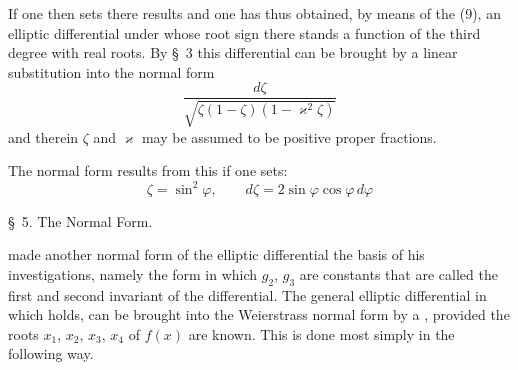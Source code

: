 
If one then sets
there results
and one has thus obtained, by means of the  (9), an elliptic differential under whose root sign there stands a function of the third degree with real roots. By \S\ 3 this differential can be brought by a linear substitution into the normal form
\[
\frac{d\zeta}{\sqrt{\zeta(1-\zeta)(1-\varkappa^2\zeta)}}
\]
and therein $\zeta$ and $\varkappa$ may be assumed to be positive proper fractions.

The  normal form results from this if one sets:
\[
\zeta = \sin^2\varphi, \qquad d\zeta = 2\sin\varphi\cos\varphi\,d\varphi
\]

\begin{center}
\S\ 5. The  Normal Form.
\end{center}

 made another normal form of the elliptic differential the basis of his investigations, namely the form
in which $g_2$, $g_3$ are constants that are called the first and second invariant of the differential. The general elliptic differential
in which
holds, can be brought into the Weierstrass normal form by a , provided the roots $x_1$, $x_2$, $x_3$, $x_4$ of $f(x)$ are known. This is done most simply in the following way.
